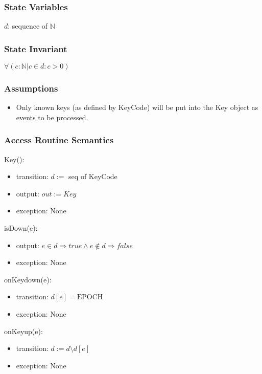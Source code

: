 \documentclass[12pt]{article}
\begin{document}
\subsubsection*{State Variables}

$d$: sequence of $\mathbb{N}$\\

\subsubsection*{State Invariant}

$\forall (c : \mathbb{N} | c \in d : c > 0)$

\subsubsection*{Assumptions}

\begin{itemize}
    \item Only known keys (as defined by KeyCode) will be put into the Key object as events to be processed.
\end{itemize}

\subsubsection*{Access Routine Semantics}

Key():
\begin{itemize}
    \item transition: $d :=$ seq of KeyCode
    \item output: $out := Key$
    \item exception: None
\end{itemize}

\noindent isDown(e):
\begin{itemize}
    \item output: $e \in d \Rightarrow true \land e \notin d \Rightarrow false$
    \item exception: None
\end{itemize}

\noindent onKeydown(e):
\begin{itemize}
    \item transition: $d[e] = \mbox{EPOCH}$
    \item exception: None
\end{itemize}

\noindent onKeyup(e):
\begin{itemize}
    \item transition: $d := d \setminus d[e]$
    \item exception: None
\end{itemize}
\end{document}
